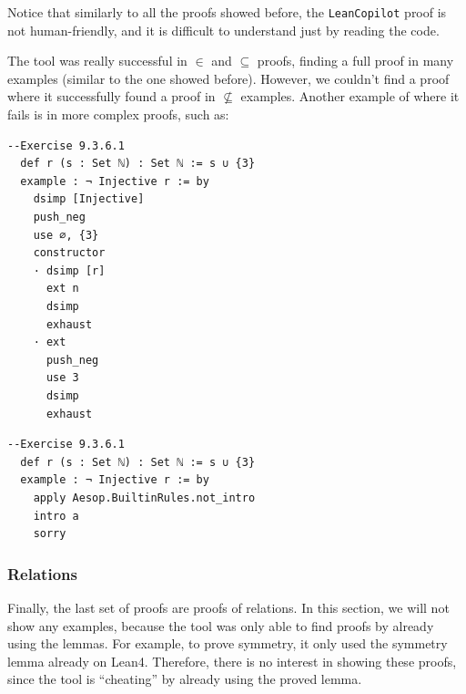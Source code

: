 \documentclass[12pt]{article}
\newcommand{\leancopilot}{\texttt{LeanCopilot} }
\begin{document}
Notice that similarly to all the proofs showed before, the \leancopilot proof is not human-friendly, and it is difficult to understand just by reading the code. 

The tool was really successful in $\in$ and $\subseteq$ proofs, finding a full proof in many examples (similar to the one showed before). However, we couldn't find a proof where it successfully found a proof in $\nsubseteq$ examples. Another example of where it fails is in more complex proofs, such as:

\begin{minipage}{0.495\textwidth}
  \begin{lstlisting}[title={Human proof}]
  --Exercise 9.3.6.1
  def r (s : Set ℕ) : Set ℕ := s ∪ {3} 
  example : ¬ Injective r := by
    dsimp [Injective]
    push_neg
    use ∅, {3}
    constructor
    · dsimp [r]
      ext n
      dsimp
      exhaust
    · ext
      push_neg
      use 3
      dsimp
      exhaust
  \end{lstlisting}
\end{minipage}
\vline
\begin{minipage}{0.495\textwidth}
  \begin{lstlisting}[title={\leancopilot proof}]
  --Exercise 9.3.6.1
  def r (s : Set ℕ) : Set ℕ := s ∪ {3}
  example : ¬ Injective r := by
    apply Aesop.BuiltinRules.not_intro
    intro a
    sorry
  \end{lstlisting}
\end{minipage}


\subsubsection{Relations}
Finally, the last set of proofs are proofs of relations. In this section, we will not show any examples, because the tool was only able to find proofs by already using the lemmas. For example, to prove symmetry, it only used the symmetry lemma already on Lean4. Therefore, there is no interest in showing these proofs, since the tool is ``cheating'' by already using the proved lemma.
\end{document}
